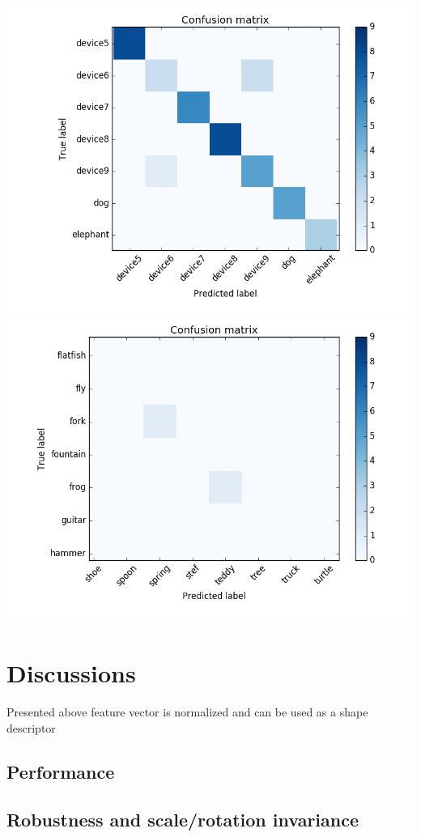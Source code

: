 \documentclass[12pt]{article}
\begin{document}
\includegraphics[scale=0.4]{device.png} 
\includegraphics[scale=0.4]{fork_fish.png} 

\section{Discussions}

Presented above feature vector is normalized and can be used as a shape descriptor  

\subsection{Performance}
\subsection{Robustness and scale/rotation invariance}



\end{document}
